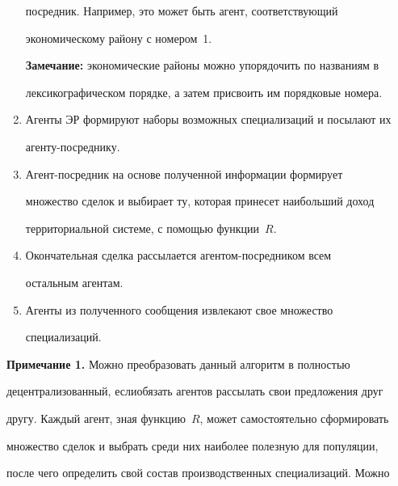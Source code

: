 \begin{multicols}{2}
\begin{enumerate}[1.]
посредник. Например, это может быть агент, соответствующий 


экономическому району с номером~1. 





\smallskip





\noindent


\textbf{Замечание:} экономические районы можно упорядочить по названиям в 


лексикографическом порядке, а затем присвоить им порядковые номера.


\item Агенты ЭР формируют наборы возможных специализаций и посылают их 


аген\-ту-по\-сред\-ни\-ку.


\item Агент-посредник на основе полученной информации формирует 


множество сделок и выбирает ту, которая принесет наибольший доход 


территориальной системе, с помощью функции~$R$.


\item Окончательная сделка рассылается аген\-том-по\-сред\-ни\-ком всем 


остальным агентам.


\item Агенты из полученного сообщения извлекают свое множество 


специализаций.


\end{enumerate}





\medskip





\noindent


\textbf{Примечание 1.} Можно преобразовать данный ал\-горитм в полностью 


децентрализованный, если\linebreak обязать агентов рассылать свои предложения друг 


другу. Каждый агент, зная функцию~$R$, может самостоятельно сформировать 


множество сделок и выбрать среди них наиболее полезную для популяции, 


после чего определить свой состав производственных специализаций. Можно 



\end{multicols}
